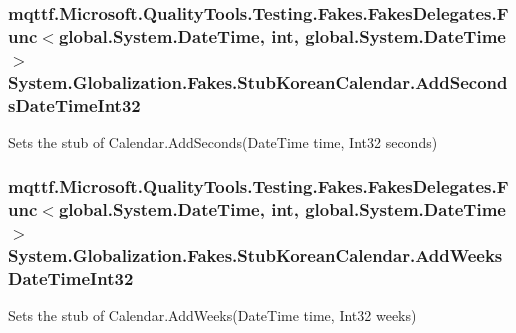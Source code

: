 \hypertarget{class_system_1_1_globalization_1_1_fakes_1_1_stub_korean_calendar_a6634ca5d9c4ff268b5b1821b42051917}{
\subsubsection[{Add\-Seconds\-Date\-Time\-Int32}]{\setlength{\rightskip}{0pt plus 5cm}mqttf.\-Microsoft.\-Quality\-Tools.\-Testing.\-Fakes.\-Fakes\-Delegates.\-Func$<$global.\-System.\-Date\-Time, int, global.\-System.\-Date\-Time$>$ System.\-Globalization.\-Fakes.\-Stub\-Korean\-Calendar.\-Add\-Seconds\-Date\-Time\-Int32}}\label{class_system_1_1_globalization_1_1_fakes_1_1_stub_korean_calendar_a6634ca5d9c4ff268b5b1821b42051917}


Sets the stub of Calendar.\-Add\-Seconds(\-Date\-Time time, Int32 seconds)

\hypertarget{class_system_1_1_globalization_1_1_fakes_1_1_stub_korean_calendar_ae31f95f52a40c0fa827cfd8c4adaface}{
\subsubsection[{Add\-Weeks\-Date\-Time\-Int32}]{\setlength{\rightskip}{0pt plus 5cm}mqttf.\-Microsoft.\-Quality\-Tools.\-Testing.\-Fakes.\-Fakes\-Delegates.\-Func$<$global.\-System.\-Date\-Time, int, global.\-System.\-Date\-Time$>$ System.\-Globalization.\-Fakes.\-Stub\-Korean\-Calendar.\-Add\-Weeks\-Date\-Time\-Int32}}\label{class_system_1_1_globalization_1_1_fakes_1_1_stub_korean_calendar_ae31f95f52a40c0fa827cfd8c4adaface}


Sets the stub of Calendar.\-Add\-Weeks(\-Date\-Time time, Int32 weeks)

